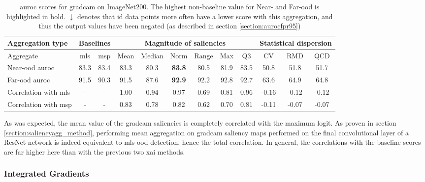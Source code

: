 \documentclass[UKenglish]{uiomasterthesis} %
\theoremstyle{definition}
\begin{document}
\begin{table}[H]
\setlength\tabcolsep{3pt}
\begin{center}
\begin{tabular}{ |p{5.1em}|c c|c c c c c c|c c c| }
    \hline
     \centering Aggregation type & \multicolumn{2}{c|}{Baselines} & \multicolumn{6}{c|}{Magnitude of saliencies} & \multicolumn{3}{p{8em}|}{\centering Statistical dispersion} \\
    \hline
    Aggregate & \ac{mls} & \ac{msp} & Mean & Median & Norm & Range & Max & Q3 & CV & RMD & QCD  \\
    \hline
    \rowcolor{near!50}
    Near-\ac{ood} \ac{auroc} & 83.3 & 83.4 & 83.3 & 80.3 &\textbf{ 83.8 }& 80.5 & 81.9 & 83.5 & 50.8 & 51.8 & 51.7  \\
    \hline
    \rowcolor{far!50}
    Far-\ac{ood} \ac{auroc} & 91.5 & 90.3 & 91.5 & 87.6 &\textbf{ 92.9 }& 92.2 & 92.8 & 92.7 & 63.6 & 64.9 & 64.8  \\
    \hline
    Correlation with \ac{mls}& - & - & 1.00 & 0.94 & 0.97 & 0.69 & 0.81 & 0.96 & -0.16 & -0.12 & -0.12  \\
    \hline
    Correlation with \ac{msp}& - & - & 0.83 & 0.78 & 0.82 & 0.62 & 0.70 & 0.81 & -0.11 & -0.07 & -0.07  \\
    \hline
    \end{tabular}
    \caption[\ac{auroc} scores for \ac{gradcam} on ImageNet200]{\ac{auroc} scores for \ac{gradcam} on ImageNet200. The highest non-baseline value for Near- and Far-\ac{ood} is highlighted in bold. $\downarrow$ denotes that \ac{id} data points more often have a lower score with this aggregation, and thus the output values have been negated (as described in section \ref{section:aurocfpr95})}
    \label{table:imagenet200_gradcam_metrics}
\end{center}
\setlength\tabcolsep{6pt}
\end{table}

As was expected, the mean value of the \ac{gradcam} saliencies is completely correlated with the maximum logit. As proven in section \ref{section:saliencyagg_method}, performing mean aggregation on \ac{gradcam} saliency maps performed on the final convolutional layer of a ResNet network is indeed equivalent to \ac{mls} \ac{ood} detection, hence the total correlation. In general, the correlations with the baseline scores are far higher here than with the previous two \ac{xai} methods.

\subsubsection{Integrated Gradients}
\end{document}
